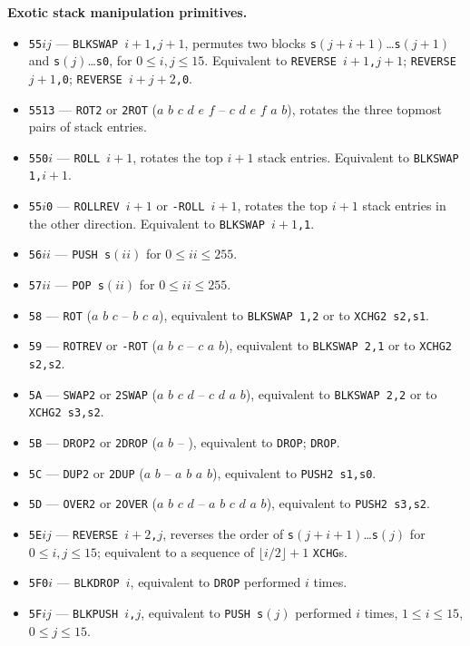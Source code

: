 \documentclass[12pt,oneside]{article}
\def\makepoint#1{\medbreak\noindent{\bf #1.\ }}
\def\nxsubpoint{\refstepcounter{subsubsection}%
  \smallbreak\makepoint{\thesubsubsection}}
\def\emb#1{\textbf{#1.}}
\begin{document}
\nxsubpoint\emb{Exotic stack manipulation primitives}
\begin{itemize}
\item {\tt 55$ij$} --- {\tt BLKSWAP $i+1$,$j+1$}, permutes two blocks {\tt s$(j+i+1)$}\dots{\tt s$(j+1)$} and {\tt s$(j)$}\dots{\tt s0}, for $0\leq i,j\leq15$. Equivalent to {\tt REVERSE $i+1$,$j+1$}; {\tt REVERSE $j+1$,0}; {\tt REVERSE $i+j+2$,0}.
\item {\tt 5513} --- {\tt ROT2} or {\tt 2ROT} ($a$ $b$ $c$ $d$ $e$ $f$ -- $c$ $d$ $e$ $f$ $a$ $b$), rotates the three topmost pairs of stack entries.
\item {\tt 550$i$} --- {\tt ROLL $i+1$}, rotates the top $i+1$ stack entries. Equivalent to {\tt BLKSWAP 1,$i+1$}.
\item {\tt 55$i$0} --- {\tt ROLLREV $i+1$} or {\tt -ROLL $i+1$}, rotates the top $i+1$ stack entries in the other direction. Equivalent to {\tt BLKSWAP $i+1$,1}.
\item {\tt 56$ii$} --- {\tt PUSH s$(ii)$} for $0\leq ii\leq 255$.
\item {\tt 57$ii$} --- {\tt POP s$(ii)$} for $0\leq ii\leq 255$.
\item {\tt 58} --- {\tt ROT} ($a$ $b$ $c$ -- $b$ $c$ $a$), equivalent to {\tt BLKSWAP 1,2} or to {\tt XCHG2 s2,s1}.
\item {\tt 59} --- {\tt ROTREV} or {\tt -ROT} ($a$ $b$ $c$ -- $c$ $a$ $b$), equivalent to {\tt BLKSWAP 2,1} or to {\tt XCHG2 s2,s2}.
\item {\tt 5A} --- {\tt SWAP2} or {\tt 2SWAP} ($a$ $b$ $c$ $d$ -- $c$ $d$ $a$ $b$), equivalent to {\tt BLKSWAP 2,2} or to {\tt XCHG2 s3,s2}.
\item {\tt 5B} --- {\tt DROP2} or {\tt 2DROP} ($a$ $b$ -- ), equivalent to {\tt DROP}; {\tt DROP}.
\item {\tt 5C} --- {\tt DUP2} or {\tt 2DUP} ($a$ $b$ -- $a$ $b$ $a$ $b$), equivalent to {\tt PUSH2 s1,s0}.
\item {\tt 5D} --- {\tt OVER2} or {\tt 2OVER} ($a$ $b$ $c$ $d$ -- $a$ $b$ $c$ $d$ $a$ $b$), equivalent to {\tt PUSH2 s3,s2}.
\item {\tt 5E$ij$} --- {\tt REVERSE $i+2$,$j$}, reverses the order of {\tt s$(j+i+1)$}\dots{\tt s$(j)$} for $0\leq i,j\leq 15$; equivalent to a sequence of $\lfloor i/2\rfloor+1$ {\tt XCHG}s.
\item {\tt 5F0$i$} --- {\tt BLKDROP $i$}, equivalent to {\tt DROP} performed $i$ times.
\item {\tt 5F$ij$} --- {\tt BLKPUSH $i$,$j$}, equivalent to {\tt PUSH s$(j)$} performed $i$ times, $1\leq i\leq 15$, $0\leq j\leq 15$.

\end{itemize}
\end{document}
